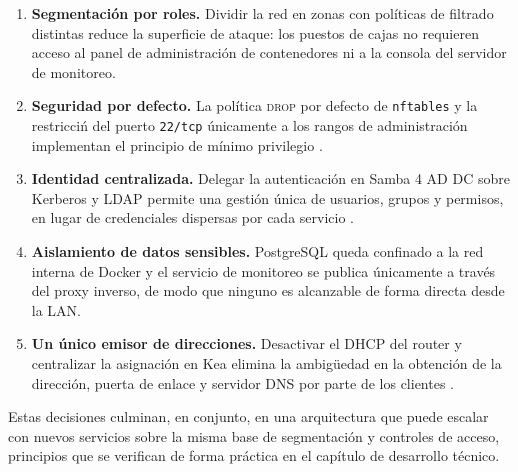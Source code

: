 \begin{enumerate}
  \item \textbf{Segmentaci\'on por roles.} Dividir la red en zonas con
        pol\'iticas de filtrado distintas reduce la superficie de ataque:
        los puestos de cajas no requieren acceso al panel de administraci\'on
        de contenedores ni a la consola del servidor de monitoreo.
  \item \textbf{Seguridad por defecto.} La pol\'itica \textsc{drop} por
        defecto de \texttt{nftables} y la restricci\'n del puerto
        \texttt{22/tcp} \'unicamente a los rangos de administraci\'on
        implementan el principio de m\'inimo privilegio
        \cite{stewart2017}.
  \item \textbf{Identidad centralizada.} Delegar la autenticaci\'on en
        Samba 4 AD DC sobre Kerberos y LDAP permite una gesti\'on \'unica de
        usuarios, grupos y permisos, en lugar de credenciales dispersas por
        cada servicio \cite{rfc4120, rfc4511}.
  \item \textbf{Aislamiento de datos sensibles.} PostgreSQL queda
        confinado a la red interna de Docker y el servicio de monitoreo se
        publica \'unicamente a trav\'es del proxy inverso, de modo que
        ninguno es alcanzable de forma directa desde la LAN.
  \item \textbf{Un \'unico emisor de direcciones.} Desactivar el DHCP del
        router y centralizar la asignaci\'on en Kea elimina la ambig\"uedad
        en la obtenci\'on de la direcci\'on, puerta de enlace y servidor DNS
        por parte de los clientes \cite{rfc2131, keaDocs}.
\end{enumerate}

Estas decisiones culminan, en conjunto, en una arquitectura que puede escalar
con nuevos servicios sobre la misma base de segmentaci\'on y controles de
acceso, principios que se verifican de forma pr\'actica en el cap\'itulo de
desarrollo t\'ecnico.
